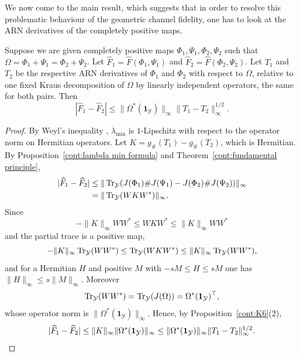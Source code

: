 We now come to the main result, which suggests that in order to resolve this problematic behaviour of the geometric channel fidelity, one has to look at the ARN derivatives of the completely positive maps. 
\begin{theorem}\label{cont:main theorem}
 Suppose we are given completely positive maps $\Phi_1, \Psi_1 ,\Phi_2, \Psi_2$ such that 
    $\Omega=\Phi_1+\Psi_1=\Phi_2+\Psi_2$. Let $\widehat{F}_1=\widehat{F}(\Phi_1,\Psi_1)$ and $\widehat{F}_2=\widehat{F}(\Phi_2,\Psi_2)$. Let $T_1$ and $T_2$ be the respective ARN derivatives of $\Phi_1$ and $\Phi_2$ with respect to $\Omega$, relative to one fixed Kraus decomposition of $\Omega$ by linearly independent operators, the same for both pairs. Then 
    \[
        |\widehat{F}_1-\widehat{F}_2|\leq \|\Omega^*(\mathbf{1}_{\mathcal{Y}})\|_\infty \|T_1-T_2\|_\infty^{1/2}.
    \]
\end{theorem}
\begin{proof}
    By Weyl's inequality \cite[Section~III.2]{bhatia1997matrix}, $\lambda_{\min}$ is $1$-Lipschitz with respect to the operator norm on Hermitian operators. Let $K=g_\#(T_1)-g_\#(T_2)$, which is Hermitian. By Proposition~\ref{cont:lambda min formula} and Theorem~\ref{cont:fundamental principle},
    \begin{align*}
           |\widehat{F}_1-\widehat{F}_2|&\leq \|\operatorname{Tr}_{\mathcal{Y}}(J(\Phi_1)\#J(\Psi_1)-J(\Phi_2)\#J(\Psi_2))\|_\infty\\
           &=\|\operatorname{Tr}_{\mathcal{Y}}(WKW^*)\|_\infty.
    \end{align*}
    Since
\[
-\|K\|_\infty WW^*\leq WKW^*\leq\|K\|_\infty WW^*
\]
and the partial trace is a positive map, 
    \[-\|K\|_\infty\operatorname{Tr}_{\mathcal{Y}}(WW^*)\leq\operatorname{Tr}_{\mathcal{Y}}(WKW^*)\leq\|K\|_\infty\operatorname{Tr}_{\mathcal{Y}}(WW^*),\]
    and for a Hermitian $H$ and positive $M$ with $-sM\leq H\leq sM$ one has $\|H\|_\infty\leq s\|M\|_\infty$. Moreover
\[
\operatorname{Tr}_{\mathcal{Y}}(WW^*)=\operatorname{Tr}_{\mathcal{Y}}(J(\Omega))=\Omega^*(\mathbf{1}_{\mathcal{Y}})^\top,
\]
whose operator norm is $\|\Omega^*(\mathbf{1}_{\mathcal{Y}})\|_\infty$. Hence, by Proposition~\ref{cont:K6}(2),
    \[
        |\widehat{F}_1-\widehat{F}_2|\leq\|K\|_\infty\|\Omega^*(\mathbf{1}_{\mathcal{Y}})\|_\infty\leq\|\Omega^*(\mathbf{1}_{\mathcal{Y}})\|_\infty\|T_1-T_2\|_\infty^{1/2}.\qedhere
    \]
\end{proof}
 
